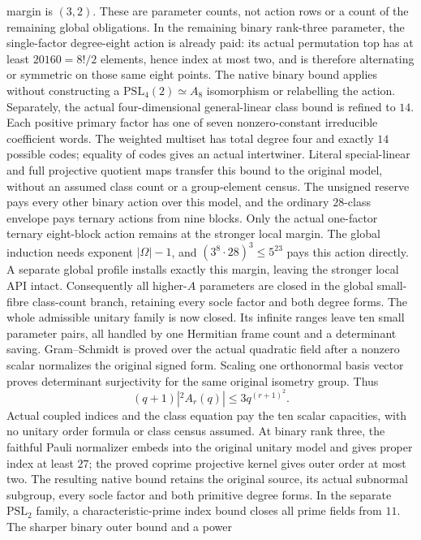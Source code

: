 margin is $(3,2)$.
These are parameter counts,
not action rows or a count of the remaining global obligations.
In the remaining binary rank-three parameter, the single-factor
degree-eight action is already paid: its actual permutation top has
at least $20160=8!/2$ elements, hence index at most two, and is therefore
alternating or symmetric on those same eight points. The native binary
bound applies without constructing a $\mathrm{PSL}_4(2)\simeq A_8$
isomorphism or relabelling the action.
Separately, the actual four-dimensional general-linear class bound
is refined to $14$. Each positive primary factor has one of seven
nonzero-constant irreducible coefficient words. The weighted multiset
has total degree four and exactly $14$ possible codes; equality of codes
gives an actual intertwiner. Literal special-linear and full projective
quotient maps transfer this bound to the original model, without an
assumed class count or a group-element census.
The unsigned reserve pays every other binary action over this model,
and the ordinary $28$-class envelope pays ternary actions from nine
blocks. Only the actual one-factor ternary eight-block action remains
at the stronger local margin. The global induction needs exponent
$|\Omega|-1$, and $(3^8\cdot28)^3\leq5^{23}$ pays this action directly.
A separate global profile installs exactly this margin, leaving the
stronger local API intact. Consequently all higher-$A$ parameters are
closed in the global small-fibre class-count branch, retaining every
socle factor and both degree forms.
The whole admissible unitary family is now closed. Its infinite ranges
leave ten small parameter pairs, all handled by one Hermitian frame
count and a determinant saving. Gram--Schmidt is proved over the actual
quadratic field after a nonzero scalar normalizes the original signed
form. Scaling one orthonormal basis vector proves determinant
surjectivity for the same original isometry group. Thus
\[
 (q+1)|{}^2A_r(q)|\leq 3q^{(r+1)^2}.
\]
Actual coupled indices and the class equation pay the ten scalar
capacities, with no unitary order formula or class census assumed.
At binary rank three, the faithful Pauli normalizer embeds into the
original unitary model and gives proper index at least $27$; the proved
coprime projective kernel gives outer order at most two. The resulting
native bound retains the original source, its actual subnormal subgroup,
every socle factor and both primitive degree forms. In the separate
$\mathrm{PSL}_2$ family, a characteristic-prime index bound closes all
prime fields from $11$. The sharper binary outer bound and a power
